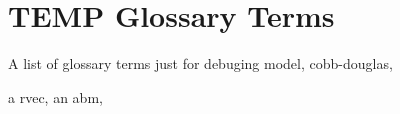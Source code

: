 \section{TEMP Glossary Terms}

A list of glossary terms just for debuging
\gls{model}, 
\gls{cobb-douglas}, 

a \gls{rvec}, 
an \gls{abm}, 
